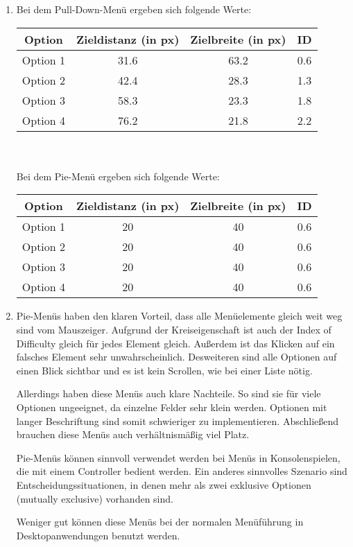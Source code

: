 \documentclass[a4paper,10pt]{scrartcl}
\begin{document}
\kopf
\renewcommand{\figurename}{Figure}


\begin{enumerate}
	\item Bei dem Pull-Down-Menü ergeben sich folgende Werte:\\
	\begin{tabular}{c|c|c|c}
		Option & Zieldistanz (in px) & Zielbreite (in px) & ID \\
		\hline
		Option 1 & 31.6 & 63.2 & 0.6 \\
		Option 2 & 42.4 & 28.3 & 1.3 \\
		Option 3 & 58.3 & 23.3 & 1.8 \\
		Option 4 & 76.2 & 21.8 & 2.2
	\end{tabular}
	\\\\
	Bei dem Pie-Menü ergeben sich folgende Werte:\\
	\begin{tabular}{c|c|c|c}
		Option & Zieldistanz (in px) & Zielbreite (in px) & ID \\
		\hline
		Option 1 & 20 & 40 & 0.6 \\
		Option 2 & 20 & 40 & 0.6 \\
		Option 3 & 20 & 40 & 0.6 \\
		Option 4 & 20 & 40 & 0.6
	\end{tabular}
	
	\item
	Pie-Menüs haben den klaren Vorteil, dass alle Menüelemente gleich weit weg sind vom Mauszeiger. Aufgrund der Kreiseigenschaft ist auch der Index of Difficulty gleich für jedes Element gleich. Außerdem ist das Klicken auf ein falsches Element sehr unwahrscheinlich. Desweiteren sind alle Optionen auf einen Blick sichtbar und es ist kein Scrollen, wie bei einer Liste nötig.
	
	Allerdings haben diese Menüs auch klare Nachteile. So sind sie für viele Optionen ungeeignet, da einzelne Felder sehr klein werden. Optionen mit langer Beschriftung sind somit schwieriger zu implementieren. Abschließend brauchen diese Menüs auch verhältnismäßig viel Platz.
	
	Pie-Menüs können sinnvoll verwendet werden bei Menüs in Konsolenspielen, die mit einem Controller bedient werden. Ein anderes sinnvolles Szenario sind Entscheidungssituationen, in denen mehr als zwei exklusive Optionen (mutually exclusive) vorhanden sind.
	
	Weniger gut können diese Menüs bei der normalen Menüführung in Desktopanwendungen benutzt werden.
\end{enumerate}
\end{document}

